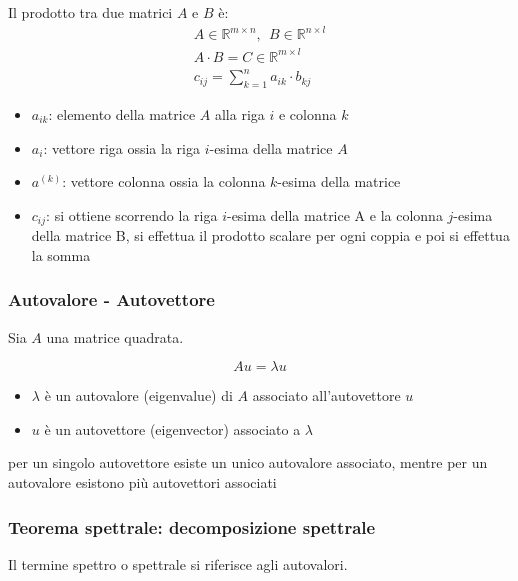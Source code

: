 \begin{mybox}
	Il prodotto tra due matrici $A$ e $B$ è:
	\begin{gather*}
	  A\in \mathbb{R}^{m\times {n}},\ \ B\in \mathbb{R}^{{n}\times l} \\
	  A\cdot B=C\in\mathbb{R}^{m\times l} \\
	  c_{ij}=\sum_{{k}=1}^{{n}}a_{i{k}}\cdot b_{{k}j}
	\end{gather*}
	\begin{itemize}[noitemsep, topsep=3pt]
		\item $a_{ik}$: elemento della matrice $A$ alla riga $i$ e colonna $k$
		\item $a_i$: vettore riga ossia la riga $i$-esima della matrice $A$
		\item $a^{(k)}$: vettore colonna ossia la colonna $k$-esima della matrice
		\item $c_{ij}$: si ottiene scorrendo la riga $i$-esima della matrice A e la colonna $j$-esima della matrice B, si effettua il prodotto scalare per ogni coppia e poi si effettua la somma
	\end{itemize}
\end{mybox}


\subsubsection{Autovalore - Autovettore}
\begin{mybox}

Sia $A$ una matrice quadrata.

$$
Au=\lambda u
$$

\begin{itemize}[noitemsep, topsep=3pt]
  \item $\lambda$ è un autovalore (eigenvalue) di $A$ associato all’autovettore $u$
  \item $u$ è un autovettore (eigenvector) associato a $\lambda$
\end{itemize}

per un singolo autovettore esiste un unico autovalore associato, mentre per un autovalore esistono più autovettori associati

\end{mybox}

\subsubsection{Teorema spettrale: decomposizione spettrale}

Il termine spettro o spettrale si riferisce agli autovalori.

